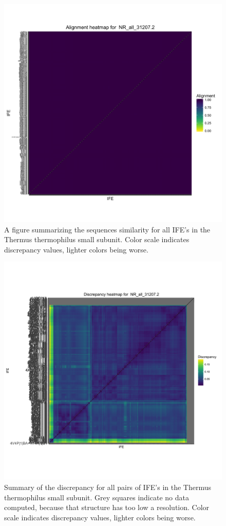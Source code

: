 \begin{figure}[h]
  \includegraphics[width=\textwidth]{chapter-3/figs/tt-ssu-align}
  \caption{A figure summarizing the sequences similarity for all IFE’s in the
    Thermus thermophilus small subunit. Color scale indicates discrepancy
  values, lighter colors being worse.}
  \label{fig:tt-ssu-align}
\end{figure}

\begin{figure}[h]
  \includegraphics[width=\textwidth]{chapter-3/figs/tt-ssu-disc}
  \caption{Summary of the discrepancy for all pairs of IFE’s in the Thermus
    thermophilus small subunit. Grey squares indicate no data computed, because
    that structure has too low a resolution. Color scale indicates discrepancy
  values, lighter colors being worse.}
  \label{fig:tt-ssu-disc}
\end{figure}

